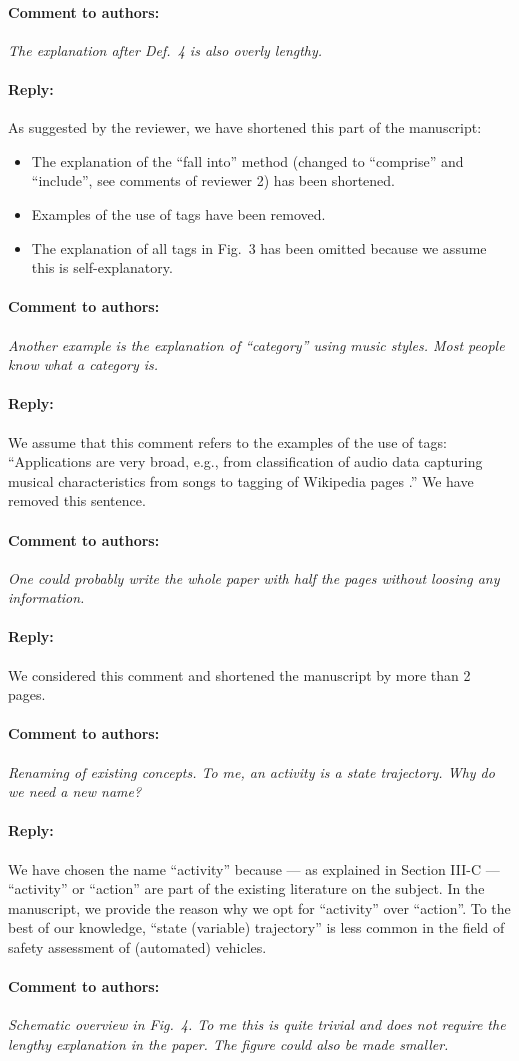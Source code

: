 \documentclass[10pt,final,a4paper,oneside,onecolumn]{article}
\newcommand{\toauthor}{\paragraph*{Comment to authors:} \itshape}
\newcommand{\fromauthor}{\paragraph*{Reply:} \normalfont}
\newcommand{\cstart}{\cbstart\color{red}}
\newcommand{\cend}{\cbend\color{black}}
\begin{document}
\toauthor The explanation after Def.~4 is also overly lengthy. 

\fromauthor As suggested by the reviewer, we have shortened this part of the manuscript:
\begin{itemize}
	\item The explanation of the ``fall into'' method (changed to \cstart ``comprise'' \cend and \cstart ``include''\cend, see comments of reviewer 2) has been shortened.
	\item Examples of the use of tags have been removed.
	\item The explanation of all tags in Fig.~3 has been omitted because we assume this is self-explanatory.
\end{itemize}



\toauthor Another example is the explanation of ``category'' using music styles. Most people know what a category is.  

\fromauthor We assume that this comment refers to the examples of the use of tags: ``Applications are very broad, e.g., from classification of audio data \autocite{kong2017joint} capturing musical characteristics from songs \autocite{ellis2011semantic} to tagging of Wikipedia pages \autocite{voss2006collaborative}.'' We have removed this sentence.



\toauthor One could probably write the whole paper with half the pages without loosing any information.

\fromauthor We considered this comment and shortened the manuscript by more than 2 pages.



\toauthor Renaming of existing concepts. To me, an activity is a state trajectory. Why do we need a new name?

\fromauthor We have chosen the name ``activity'' because --- as explained in Section III-C --- ``activity'' \autocite{elrofai2018scenario,catapult2018musicc} or ``action'' \autocite{ulbrich2015} are part of the existing literature on the subject. In the manuscript, we provide the reason why we opt for ``activity'' over ``action''. To the best of our knowledge, ``state (variable) trajectory'' is less common in the field of safety assessment of (automated) vehicles.



\toauthor Schematic overview in Fig.~4. To me this is quite trivial and does not require the lengthy explanation in the paper. The figure could also be made smaller.
\end{document}
